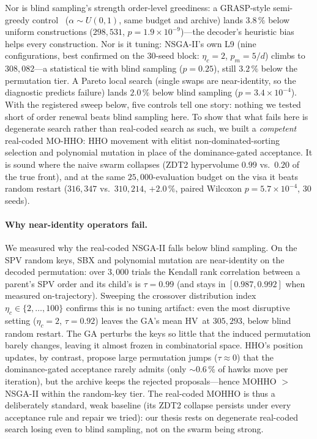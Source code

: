 \documentclass[runningheads]{llncs}
\newcommand{\HV}{\textsf{HV}}
\begin{document}
Nor is blind sampling's strength order-level greediness: a GRASP-style semi-greedy control~\cite{feo} ($\alpha\sim U(0,1)$, same budget and archive) lands $3.8\,\%$ below uniform constructions ($298{,}531$, $p=1.9\times10^{-9}$)---the decoder's heuristic bias~\cite{raidl} helps every construction. Nor is it tuning: NSGA-II's own L9 (nine configurations, best confirmed on the 30-seed block: $\eta_c{=}2$, $p_m{=}5/d$) climbs to $308{,}082$---a statistical tie with blind sampling ($p=0.25$), still $3.2\,\%$ below the permutation tier. A Pareto local search (single swaps are near-identity, so the diagnostic predicts failure) lands $2.0\,\%$ below blind sampling ($p=3.4\times10^{-4}$). With the registered sweep below, five controls tell one story: nothing we tested short of order renewal beats blind sampling here. To show that what fails here is degenerate search rather than real-coded search as such, we built a \emph{competent} real-coded MO-HHO: HHO movement with elitist non-dominated-sorting selection and polynomial mutation in place of the dominance-gated acceptance. It is sound where the naive swarm collapses (ZDT2 hypervolume $0.99$ vs.\ $0.20$ of the true front), and at the same $25{,}000$-evaluation budget on the visa it beats random restart ($316{,}347$ vs.\ $310{,}214$, $+2.0\,\%$, paired Wilcoxon $p=5.7\times10^{-4}$, 30 seeds).

\paragraph{Why near-identity operators fail.}
We measured why the real-coded NSGA-II falls below blind sampling. On the SPV random keys, SBX and polynomial mutation are near-identity on the decoded permutation: over $3{,}000$ trials the Kendall rank correlation between a parent's SPV order and its child's is $\tau=0.99$ (and stays in $[0.987,0.992]$ when measured on-trajectory). Sweeping the crossover distribution index $\eta_c\in\{2,\dots,100\}$ confirms this is no tuning artifact: even the most disruptive setting ($\eta_c{=}2$, $\tau{=}0.92$) leaves the GA's mean \HV\ at $305{,}293$, below blind random restart. The GA perturbs the keys so little that the induced permutation barely changes, leaving it almost frozen in combinatorial space. HHO's position updates, by contrast, propose large permutation jumps ($\tau\approx0$) that the dominance-gated acceptance rarely admits (only ${\sim}0.6\,\%$ of hawks move per iteration), but the archive keeps the rejected proposals---hence MOHHO $>$ NSGA-II within the random-key tier. The real-coded MOHHO is thus a deliberately standard, weak baseline (its ZDT2 collapse persists under every acceptance rule and repair we tried): our thesis rests on degenerate real-coded search losing even to blind sampling, not on the swarm being strong.
\end{document}
